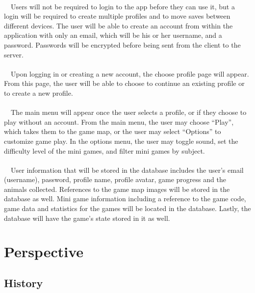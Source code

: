 \documentclass[12pt]{report}
\begin{document}
		\paragraph{}\ \ Users will not be required to login to the app before they can use it, but a login will be required to create multiple profiles and to move saves between different devices. The user will be able to create an account from within the application with only an email, which will be his or her username, and a password. Passwords will be encrypted before being sent from the client to the server.
		
		\paragraph{}\ \ Upon logging in or creating a new account, the choose profile page will appear. From this page, the user will be able to choose to continue an existing profile or to create a new profile.
				
		\paragraph{}\ \ The main menu will appear once the user selects a profile, or if they choose to play without an account. From the main menu, the user may choose “Play”, which takes them to the game map, or the user may select “Options” to customize game play. In the options menu, the user may toggle sound, set the difficulty level of the mini games, and filter mini games by subject.
				
		\paragraph{}\ \ User information that will be stored in the database includes the user's email (username), password, profile name, profile avatar, game progress and the animals collected. References to the game map images will be stored in the database as well. Mini game information including a reference to the game code, game data and statistics for the games will be located in the database. Lastly, the database will have the game's state stored in it as well.
		
	\section{Perspective}
	
		\subsection{History}
\end{document}
